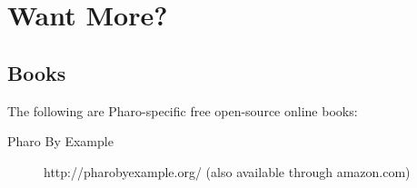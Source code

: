 \documentclass[notumble]{leaflet}
\begin{document}
\section{Want More?}

\subsection{Books}

The following are Pharo-specific free open-source online books:

\begin{description}
\item[Pharo By Example] http://pharobyexample.org/ (also available
  through amazon.com)
\end{description}
\end{document}
